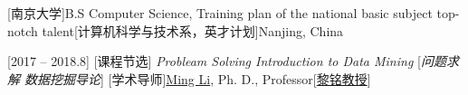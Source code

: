 \documentclass[language=english]{bilingualcv}
\begin{document}
\maketitle
\begin{education}
    [南京大学]{B.S Computer Science, Training plan of the national basic subject top-notch talent}[计算机科学与技术系，英才计划]{Nanjing, China}
    \begin{detail}
        [2017 -- 2018.8]
        [课程节选]{ 
              {\it Probleam Solving \hspace{1cm}Introduction to Data Mining}
        }[\textit{问题求解\hspace{1cm} 数据挖掘导论}]
        [学术导师]{\href{http://cs.nju.edu.cn/lim/}{Ming Li}, Ph. D., Professor}[\href{http://cs.nju.edu.cn/lim/}{黎铭教授}]
    \end{detail}
\end{education}
\end{document}
